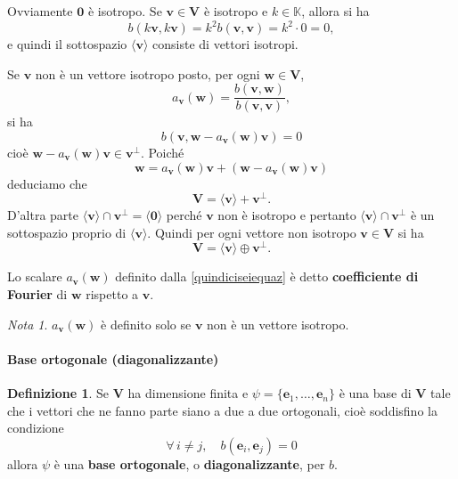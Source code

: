 \documentclass{article}
\theoremstyle{plain}
\theoremstyle{definition}
\newtheorem{defn}{Definizione}[section]
\theoremstyle{remark}
\newtheorem{note}{Nota}
\begin{document}
\vspace{10pt}

Ovviamente $\mathbf{0}$ è isotropo. Se $\mathbf{v} \in\mathbf{V}$ è isotropo e $k\in\mathbb{K}$, allora si ha
\[b(k\mathbf{v}, k\mathbf{v}) = k^2 b(\mathbf{v}, \mathbf{v}) = k^2 \cdot 0 = 0,\]
e quindi il sottospazio $\langle \mathbf{v} \rangle$ consiste di vettori isotropi.

\vspace{10pt}

Se $\mathbf{v}$ non è un vettore isotropo posto, per ogni $\mathbf{w} \in \mathbf{V}$,
\begin{equation}\label{quindiciseiequaz}
a_{\mathbf{v}}(\mathbf{w}) = \dfrac{b(\mathbf{v}, \mathbf{w})}{b(\mathbf{v}, \mathbf{v})},
\end{equation}
si ha
\[b(\mathbf{v}, \mathbf{w} - a_{\mathbf{v}}(\mathbf{w})\mathbf{v}) = 0\]
cioè $\mathbf{w} - a_{\mathbf{v}}(\mathbf{w})\mathbf{v} \in \mathbf{v}^{\perp}$. Poiché
\[\mathbf{w} = a_{\mathbf{v}}(\mathbf{w})\mathbf{v} + (\mathbf{w} - a_{\mathbf{v}}(\mathbf{w})\mathbf{v})\]
deduciamo che 
\[\mathbf{V} = \langle \mathbf{v} \rangle + \mathbf{v}^{\perp}.\]
D'altra parte $\langle \mathbf{v} \rangle \cap \mathbf{v}^{\perp} = \langle \mathbf{0} \rangle$ perché 
$\mathbf{v}$ non è isotropo e pertanto $\langle \mathbf{v} \rangle \cap \mathbf{v}^{\perp}$ è un sottospazio 
proprio di $\langle \mathbf{v} \rangle$. Quindi per ogni vettore non isotropo $\mathbf{v} \in \mathbf{V}$ si ha
\begin{equation}\label{quindicisette}
\mathbf{V} = \langle \mathbf{v} \rangle \oplus \mathbf{v}^{\perp}.
\end{equation}

\vspace{10pt}

Lo scalare $a_{\mathbf{v}}(\mathbf{w})$ definito dalla \ref{quindiciseiequaz} è detto 
\textbf{coefficiente di Fourier} di $\mathbf{w}$ rispetto a $\mathbf{v}$. 

\vspace{10pt}

\begin{note}
$a_{\mathbf{v}}(\mathbf{w})$ è definito solo se $\mathbf{v}$ non è un vettore isotropo.    
\end{note}

\vspace{10pt}

\paragraph{Base ortogonale (diagonalizzante)}
\begin{bxthm}
\begin{defn}
Se $\mathbf{V}$ ha dimensione finita e $\psi = \{\mathbf{e}_1, \ldots, \mathbf{e}_n\}$ è una base di $\mathbf{V}$ 
tale che i vettori che ne fanno parte siano a due a due ortogonali, cioè soddisfino la condizione
\[
\forall\, i \neq j,\quad b(\mathbf{e}_i, \mathbf{e}_j) = 0
\]
allora $\psi$ è una \textbf{base ortogonale}, o \textbf{diagonalizzante}, per $b$.    
\end{defn}
\end{bxthm}
\end{document}
